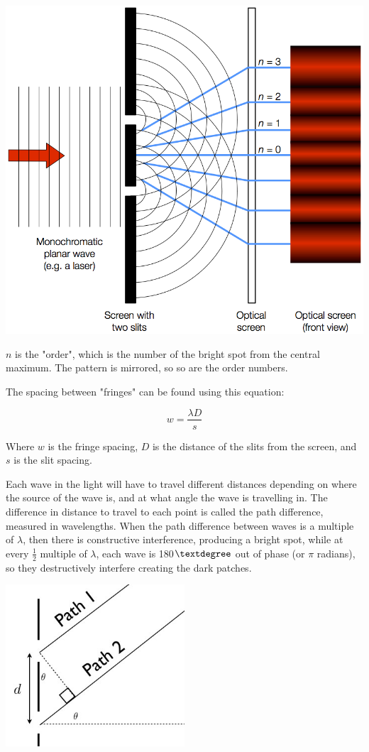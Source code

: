 \documentclass[a4paper, 12pt]{article}
\begin{document}
\begin{center}
\includegraphics[width=\textwidth]{images/Double-slit-diffraction-diagram.png}
\end{center}

$n$ is the "order", which is the number of the bright spot from the central maximum. The pattern is mirrored, so so are the order numbers.

The spacing between "fringes" can be found using this equation:

$$
w = \frac{{\lambda}D}{s}
$$

Where $w$ is the fringe spacing, $D$ is the distance of the slits from the screen, and $s$ is the slit spacing. 

Each wave in the light will have to travel different distances depending on where the source of the wave is, and at what angle the wave is travelling in. The difference in distance to travel to each point is called the path difference, measured in wavelengths. When the path difference between waves is a multiple of $\lambda$, then there is constructive interference, producing a bright spot, while at every $\frac{1}{2}$ multiple of $\lambda$, each wave is 180$\textdegree$ out of phase (or $\pi$ radians), so they destructively interfere creating the dark patches.

\begin{center}
\includegraphics[width=0.5\textwidth]{images/pathDifference.jpg}
\end{center}
\end{document}
